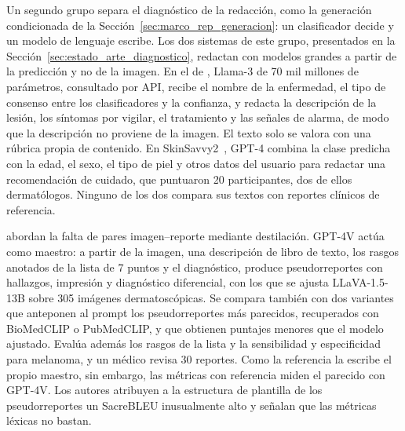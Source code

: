 Un segundo grupo separa el diagnóstico de la redacción, como la generación condicionada de la
Sección~\ref{sec:marco_rep_generacion}: un clasificador decide y un modelo de lenguaje escribe. Los dos sistemas de
este grupo, presentados en la Sección~\ref{sec:estado_arte_diagnostico}, redactan con modelos grandes a partir de la
predicción y no de la imagen. En el de \textcite{khan2025ensemble}, Llama-3 de 70 mil millones de parámetros,
consultado por API, recibe el nombre de la enfermedad, el tipo de consenso entre los clasificadores y la confianza, y
redacta la descripción de la lesión, los síntomas por vigilar, el tratamiento y las señales de alarma, de modo que la
descripción no proviene de la imagen. El texto solo se valora con una rúbrica propia de contenido. En
SkinSavvy2~\cite{kim2025skinsavvy2}, GPT-4 combina la clase predicha con la edad, el sexo, el tipo de piel y otros
datos del usuario para redactar una recomendación de cuidado, que puntuaron 20 participantes, dos de ellos
dermatólogos. Ninguno de los dos compara sus textos con reportes clínicos de referencia.

\textcite{chakrabarti2025skin} abordan la falta de pares imagen--reporte mediante destilación. GPT-4V actúa como
maestro: a partir de la imagen, una descripción de libro de texto, los rasgos anotados de la lista de 7 puntos y el
diagnóstico, produce pseudorreportes con hallazgos, impresión y diagnóstico diferencial, con los que se ajusta
LLaVA-1.5-13B sobre 305 imágenes dermatoscópicas. Se compara también con dos variantes que anteponen al
prompt los pseudorreportes más parecidos, recuperados con BioMedCLIP o PubMedCLIP, y que obtienen puntajes
menores que el modelo ajustado. Evalúa además los rasgos de la lista y la sensibilidad y especificidad para
melanoma, y un médico revisa 30 reportes. Como la referencia la escribe el propio maestro, sin embargo, las métricas
con referencia miden el parecido con GPT-4V. Los autores atribuyen a la estructura de plantilla de los
pseudorreportes un SacreBLEU inusualmente alto y señalan que las métricas léxicas no bastan.

